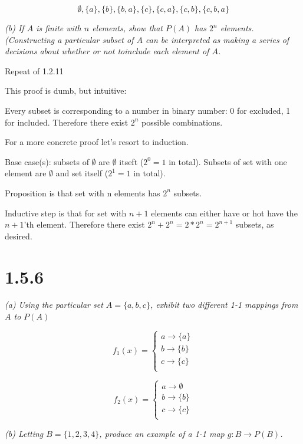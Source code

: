 \documentclass[11pt,oneside,titlepage]{book}
\begin{document}
$$\emptyset, \{a\}, \{b\}, \{b, a\}, \{c\}, \{c, a\}, \{c, b\},  \{c, b, a\}$$

\textit{(b) If $A$ is finite with $n$ elements, show that $P(A)$ has $2^n$ elements.
  (Constructing a particular subset of $A$ can be interpreted as making a series of
  decisions about whether or not toinclude each element of $A$.}

Repeat of 1.2.11

This proof is dumb, but intuitive:

Every subset is corresponding to a number in binary number: 0 for excluded,
1 for included. Therefore there exist $2^n$ possible combinations.

For a more concrete proof let's resort to induction.

Base case(s): subsets of $\emptyset$ are $\emptyset$ itseft ($2^0 = 1$ in total). Subsets of
set with one element are $\emptyset$ and set itself ($2^1 = 1$ in total).

Proposition is that set with n elements has $2^n$ subsets.

Inductive step is that for set with $n + 1$ elements can either have or hot
have the $n + 1$'th element. Therefore there exist $2^n + 2^n = 2 * 2^n =
2^{n + 1}$ subsets, as desired.

\section*{1.5.6}
\textit{(a) Using the particular set $A = \{a, b, c\}$, exhibit two different
  1-1 mappings from $A$ to $P(A)$}

\begin{equation}
  f_1(x) =
  \begin{cases}
    a \to \{a\} \\
    b \to \{b\} \\
    c \to \{c\} \\
  \end{cases}    
\end{equation}

\begin{equation}
  f_2(x) =
  \begin{cases}
    a \to \emptyset \\
    b \to \{b\} \\
    c \to \{c\} \\
  \end{cases}    
\end{equation}

\textit{(b) Letting $B = \{1, 2, 3, 4\}$, produce an example of a 1-1 map $g: B \to P(B)$.
}
\end{document}
